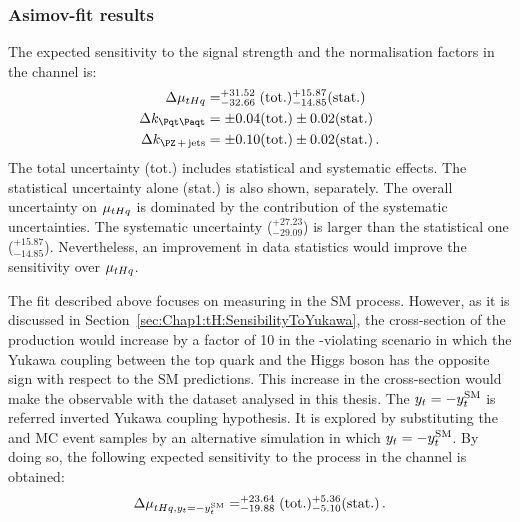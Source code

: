\subsubsection{Asimov-fit results \dilepOStau}
\label{sec:ChaptH:Fit:ASIMOV:OS:results}
The expected sensitivity to the signal strength and the normalisation factors in the \dilepOStau channel is: 
\begin{align}
	\Delta \mu_{\tHq} 	&= ^{+31.52}_{-32.66} (\text{tot.}) ^{+15.87}_{-14.85} (\text{stat.}) \label{eq:ChaptH:ASIMOV:OS:POIs:mu} \\
	\Delta k_{\ttbar} 	&= \pm 0.04 (\text{tot.}) \pm 0.02 (\text{stat.}) \label{eq:ChaptH:ASIMOV:OS:POIs:ktt} \\
	\Delta k_{\Zjets} 	&= \pm 0.10 (\text{tot.}) \pm 0.02 (\text{stat.}) \label{eq:ChaptH:ASIMOV:OS:POIs:kzj} \, .
\end{align}
The total uncertainty (tot.) includes statistical and systematic effects.
The statistical uncertainty alone (stat.) is also shown, separately. 
The overall uncertainty on $\mu_{tHq}$ is dominated by the contribution of the systematic uncertainties. 
The systematic uncertainty ($^{+27.23}_{-29.09}$) is larger than the statistical
one ($^{+15.87}_{-14.85}$). Nevertheless, an improvement in data statistics would 
improve the sensitivity over $\mu_{tHq}$.


The fit described above focuses on measuring in the SM \tHq process. However, as it is discussed 
in Section~\ref{sec:Chap1:tH:SensibilityToYukawa}, the cross-section of the \tH production would increase
by a factor of 10 in the \CP-violating scenario in which the Yukawa coupling
between the top quark and the Higgs boson has the opposite sign with respect to the SM predictions.
This increase in the cross-section would make the \tHq observable with the dataset analysed in this thesis.
The $y_{t}=-y_{t}^{\text{SM}}$ is referred inverted Yukawa coupling hypothesis. It is explored by substituting the \tHq and \tWH MC event samples by an alternative simulation in which $y_{t} = -y_{t}^{\text{SM}}$. 
By doing so, the following expected sensitivity to the \tHq process in the \dilepOStau channel is obtained:
\begin{equation*}
	\Delta \mu_{tHq, y_{t}=-y_{t}^{\text{SM}}} = ^{+23.64}_{-19.88} (\text{tot.}) ^{+5.36}_{-5.10} (\text{stat.}) \label{eq:ChaptH:ASIMOV:OS:POIs:mu_ytm1} \,.
\end{equation*}



